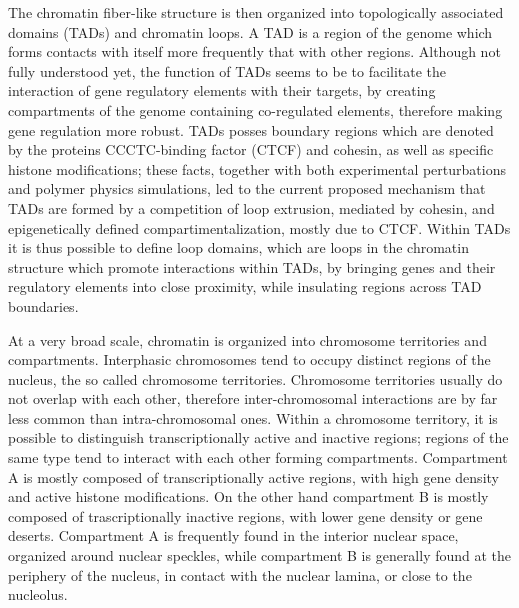 
The chromatin fiber-like structure is then organized into topologically associated domains (TADs) and chromatin loops. A TAD is a region of the genome which forms contacts with itself more frequently that with other regions. Although not fully understood yet, the function of TADs seems to be to facilitate the interaction of gene regulatory elements with their targets, by creating compartments of the genome containing co-regulated elements, therefore making gene regulation more robust\cite{tadrole2018}. TADs posses boundary regions which are denoted by the proteins CCCTC-binding factor (CTCF) and cohesin, as well as specific histone modifications\cite{chromatindevelopment2019}; these facts, together with both experimental perturbations and polymer physics simulations, led to the current proposed mechanism that TADs are formed by a competition of loop extrusion, mediated by cohesin, and epigenetically defined compartimentalization, mostly due to CTCF\cite{tadformation2018}. Within TADs it is thus possible to define loop domains, which are loops in the chromatin structure which promote interactions within TADs, by bringing genes and their regulatory elements into close proximity, while insulating regions across TAD boundaries\cite{chromatindevelopment2019}. 

At a very broad scale, chromatin is organized into chromosome territories and compartments. Interphasic chromosomes tend to occupy distinct regions of the nucleus, the so called chromosome territories\cite{chromosometerritories2010}. Chromosome territories usually do not overlap with each other, therefore inter-chromosomal interactions are by far less common than intra-chromosomal ones. Within a chromosome territory, it is possible to distinguish transcriptionally active and inactive regions; regions of the same type tend to interact with each other forming compartments. Compartment A is mostly composed of transcriptionally active regions, with high gene density and active histone modifications. On the other hand compartment B is mostly composed of trascriptionally inactive regions, with lower gene density or gene deserts\cite{chromatindevelopment2019}. Compartment A is frequently found in the interior nuclear space, organized around nuclear speckles, while compartment B is generally found at the periphery of the nucleus, in contact with the nuclear lamina, or close to the nucleolus\cite{chromatinorganization2019, chromatindevelopment2019}.

